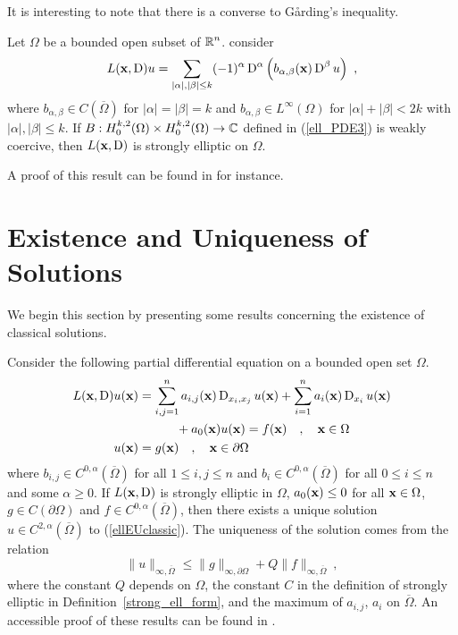 It is interesting to note that there is a converse to
G\r{a}rding's inequality.

\begin{theorem}
Let $\Omega$ be a bounded open subset of $\displaystyle \mathbb{R}^n$.  consider
\[
L(\mathbf{x},\operatorname{D})u = \sum_{|\alpha|,|\beta|\leq k} (-1)^\alpha \operatorname{D}^\alpha
\left( b_{\alpha,\beta}(\mathbf{x}) \operatorname{D}^\beta u\right) \ ,
\]
where $\displaystyle b_{\alpha,\beta} \in C(\overline{\Omega})$ for
$|\alpha|=|\beta|=k$ and
$\displaystyle b_{\alpha,\beta} \in L^\infty(\Omega)$ for
$|\alpha|+|\beta|<2k$ with $|\alpha|,|\beta|\leq k$.  If
$\displaystyle B : H^{k,2}_0(\Omega) \times H^{k,2}_0(\Omega)
\rightarrow \mathbb{C}$ defined in (\ref{ell_PDE3}) is weakly coercive, then
$L(\mathbf{x},\operatorname{D})$ is strongly elliptic on $\Omega$.
\end{theorem}

A proof of this result can be found in \cite{FoPDE} for instance.

\section{Existence and Uniqueness of Solutions}

We begin this section by presenting some results concerning the
existence of classical solutions.

Consider the following partial differential equation on a bounded
open set $\Omega$.
\begin{equation} \label{ellEUclassic}
\begin{split}
L(\mathbf{x}, \operatorname{D})u(\mathbf{x})
&= \sum_{i,j=1}^n a_{i,j}(\mathbf{x}) \operatorname{D}_{x_i,x_j} u(\mathbf{x})
+ \sum_{i=1}^n a_i(\mathbf{x}) \operatorname{D}_{x_i} u(\mathbf{x}) \\
& \qquad \quad + a_0(\mathbf{x})u(\mathbf{x}) = f(\mathbf{x})
\quad , \quad \mathbf{x} \in \Omega \\
u(\mathbf{x}) &= g(\mathbf{x}) \quad , \quad \mathbf{x} \in \partial \Omega
\end{split}
\end{equation}
where $\displaystyle b_{i,j} \in C^{0,\alpha}(\overline{\Omega})$ for
all $1\leq i, j \leq n$ and
$\displaystyle b_i \in C^{0,\alpha}(\overline{\Omega})$ for all
$0 \leq i \leq n$ and some $\alpha \geq 0$.  If $L(\mathbf{x},\operatorname{D})$ is
strongly elliptic in $\Omega$, $a_0(\mathbf{x}) \leq 0$ for all
$\mathbf{x} \in \Omega$, $g \in C(\partial \Omega)$ and
$\displaystyle f \in C^{0,\alpha}(\overline{\Omega})$,
then there exists a unique solution
$\displaystyle u \in C^{2,\alpha}(\overline{\Omega})$
to (\ref{ellEUclassic}).  The uniqueness of the solution comes from
the relation
\[
  \|u\|_{\infty,\overline{\Omega}} \leq \|g\|_{\infty,\partial \Omega}
  + Q \|f\|_{\infty,\overline{\Omega}} \ ,
\]
where the constant $Q$ depends on $\Omega$, the constant $C$ in the
definition of strongly elliptic in Definition~\ref{strong_ell_form},
and the maximum of $a_{i,j}$, $a_i$ on $\overline{\Omega}$.
An accessible proof of these results can be found in \cite{Smo}.


